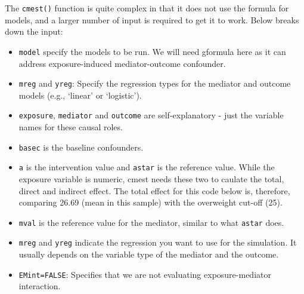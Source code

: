 \documentclass[
]{book}
\providecommand{\tightlist}{%
  \setlength{\itemsep}{0pt}\setlength{\parskip}{0pt}}
\begin{document}
The \texttt{cmest()} function is quite complex in that it does not use the formula for models, and a larger number of input is required to get it to work. Below breaks down the input:

\begin{itemize}
\tightlist
\item
  \texttt{model} specify the models to be run. We will need gformula here as it can address exposure-induced mediator-outcome confounder.
\item
  \texttt{mreg} and \texttt{yreg}: Specify the regression types for the mediator and outcome models (e.g., `linear' or `logistic').
\item
  \texttt{exposure}, \texttt{mediator} and \texttt{outcome} are self-explanatory - just the variable names for these causal roles.
\item
  \texttt{basec} is the baseline confounders.
\item
  \texttt{a} is the intervention value and \texttt{astar} is the reference value. While the exposure variable is numeric, cmest needs these two to caulate the total, direct and indirect effect. The total effect for this code below is, therefore, comparing 26.69 (mean in this sample) with the overweight cut-off (25).
\item
  \texttt{mval} is the reference value for the mediator, similar to what \texttt{astar} does.
\item
  \texttt{mreg} and \texttt{yreg} indicate the regression you want to use for the simulation. It usually depends on the variable type of the mediator and the outcome.
\item
  \texttt{EMint=FALSE}: Specifies that we are not evaluating exposure-mediator interaction.
\end{itemize}
\end{document}
